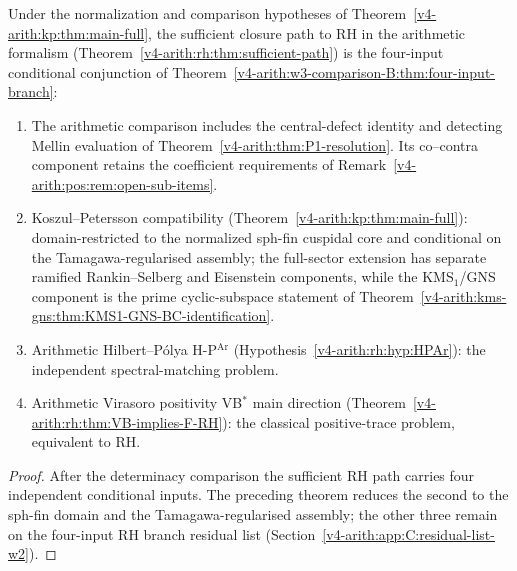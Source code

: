 \begin{corollary}
\label{v4-arith:kp:cor:rh-minimal-updated}
Under the normalization and comparison hypotheses of
Theorem~\ref{v4-arith:kp:thm:main-full}, the sufficient closure path to
RH in the arithmetic formalism
(Theorem~\ref{v4-arith:rh:thm:sufficient-path}) is the four-input
conditional conjunction of
Theorem~\ref{v4-arith:w3-comparison-B:thm:four-input-branch}:
\begin{enumerate}
\item The arithmetic comparison includes the central-defect identity
and detecting Mellin evaluation of
Theorem~\ref{v4-arith:thm:P1-resolution}.
Its co--contra component retains the coefficient requirements of
Remark~\ref{v4-arith:pos:rem:open-sub-items}.
\item Koszul--Petersson compatibility
(Theorem~\ref{v4-arith:kp:thm:main-full}): domain-restricted to the
normalized sph-fin cuspidal core and conditional on the
Tamagawa-regularised assembly; the full-sector extension has separate
ramified Rankin--Selberg and Eisenstein components, while the
KMS\(_1\)/GNS component is the prime cyclic-subspace statement of
Theorem~\ref{v4-arith:kms-gns:thm:KMS1-GNS-BC-identification}.
\item Arithmetic Hilbert--P\'olya H-P\(^{\mathrm{Ar}}\)
(Hypothesis~\ref{v4-arith:rh:hyp:HPAr}): the independent spectral-matching
problem.
\item Arithmetic Virasoro positivity VB\(^{*}\) main direction
(Theorem~\ref{v4-arith:rh:thm:VB-implies-F-RH}): the classical
positive-trace problem, equivalent to RH.
\end{enumerate}
\end{corollary}

\begin{proof}
After the determinacy comparison the sufficient RH path carries four
independent conditional inputs. The preceding theorem reduces the second to
the sph-fin domain and the Tamagawa-regularised assembly; the other
three remain on the
four-input RH branch residual list
(Section~\ref{v4-arith:app:C:residual-list-w2}).
\end{proof}

